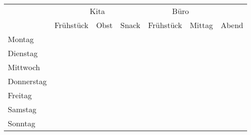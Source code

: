 \documentclass[a4paper,12pt]{article}
\begin{document}
\pagestyle{empty}

\centering
\begin{tabular}{l|p{2cm}|p{2cm}|p{2cm}|p{2cm}|p{2cm}|p{2cm}}
  \multicolumn{1}{c|}{} & \multicolumn{3}{c|}{Kita} & \multicolumn{2}{c|}{Büro} & \\
             & Frühstück & Obst & Snack & Frühstück & Mittag & Abend \\
  \hline 
  Montag     &           &      &       &           &        &       \\[2.7cm]
  \hline
  Dienstag   &           &      &       &           &        &       \\[2.7cm]
  \hline
  Mittwoch   &           &      &       &           &        &       \\[2.7cm]
  \hline
  Donnerstag &           &      &       &           &        &       \\[2.7cm]
  \hline
  Freitag    &           &      &       &           &        &       \\[2.7cm]
  \hline
  Samstag    &           &      &       &           &        &       \\[2.7cm]
  \hline
  Sonntag    &           &      &       &           &        &       \\[2.7cm]
\end{tabular}
\vfill
\end{document}
